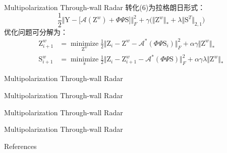 \documentclass[12pt]{beamer}
\begin{document}
\begin{frame}{Multipolarization Through-wall Radar}
  转化(6)为拉格朗日形式：
  \begin{equation}
	\frac{1}{2}\Big\Vert \text{Y}-\big[\mathcal{A}(\text{Z}^{w})+\Phi\Psi\text{S}\big]\Big\Vert_{F}^2 +\gamma\big(\Vert \text{Z}^{w}\Vert_{*}+\lambda\Vert \text{S}^T\Vert_{2,1}\big) 
  \end{equation}
  优化问题可分解为：
  \begin{equation}
	\begin{split}
  \text{Z}_{i+1}^w&=\mathop{\text{minimize}}\limits_{\text{Z}^{w}}\frac{1}{2}\Big\Vert \text{Z}_i-\text{Z}^{w}-\mathcal{A}^*(\Phi\Psi\text{S}_i)\Big\Vert_{F}^2 +\alpha\gamma\Vert\text{Z}^{w}\Vert_{*}\\ 
	\text{S}_{i+1}^w&=\mathop{\text{minimize}}\limits_{\text{s}}\frac{1}{2}\Big\Vert \text{Z}_{i}-\text{Z}^{w}_{i+1}-\mathcal{A}^*(\Phi\Psi\text{S})\Big\Vert_{F}^2 +\alpha\gamma\lambda\Vert\text{Z}^{w}\Vert_{*} 
  \end{split}
  \end{equation}

\end{frame}
\begin{frame}{Multipolarization Through-wall Radar}
\end{frame}
\begin{frame}{Multipolarization Through-wall Radar}
\end{frame}
\begin{frame}{Multipolarization Through-wall Radar}
\end{frame}
\begin{frame}{Multipolarization Through-wall Radar}
\end{frame}
\begin{frame}[allowframebreaks]{References}
  \footnotesize
   
   
\end{frame}
\end{document}
